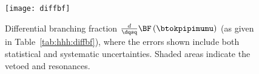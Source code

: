 \begin{figure}
  \begin{center}
    \texttt{[image: diffbf]}
    \caption{\small
      Differential branching fraction $\tfrac{d}{\dqsq}\BF\left(\btokpipimumu\right)$
      (as given in Table~\protect\ref{tab:hhh:diffbf}), where the
      errors shown include both statistical and systematic uncertainties.
      Shaded areas indicate the vetoed \jpsi and \psitwos resonances.
    }
    \label{fig}
  \end{center}
\end{figure}






